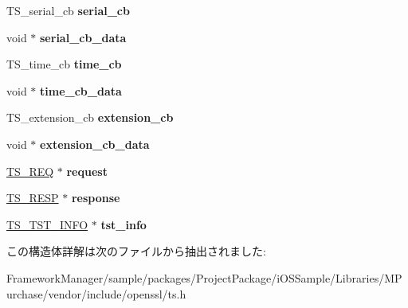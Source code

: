 \begin{DoxyCompactItemize}
\item 
\hypertarget{struct_t_s__resp__ctx_a26180bbb9b639e92b2b0fa2c84ce30f2}{}T\+S\+\_\+serial\+\_\+cb {\bfseries serial\+\_\+cb}\label{struct_t_s__resp__ctx_a26180bbb9b639e92b2b0fa2c84ce30f2}

\item 
\hypertarget{struct_t_s__resp__ctx_a428e1ae893e00dea7088a4caed4ff52b}{}void $\ast$ {\bfseries serial\+\_\+cb\+\_\+data}\label{struct_t_s__resp__ctx_a428e1ae893e00dea7088a4caed4ff52b}

\item 
\hypertarget{struct_t_s__resp__ctx_a838a0b82016f7bcf6aabe4102f1a4ac8}{}T\+S\+\_\+time\+\_\+cb {\bfseries time\+\_\+cb}\label{struct_t_s__resp__ctx_a838a0b82016f7bcf6aabe4102f1a4ac8}

\item 
\hypertarget{struct_t_s__resp__ctx_aa818a3e3400ed231cf9b6fb084fe5cd6}{}void $\ast$ {\bfseries time\+\_\+cb\+\_\+data}\label{struct_t_s__resp__ctx_aa818a3e3400ed231cf9b6fb084fe5cd6}

\item 
\hypertarget{struct_t_s__resp__ctx_a76759785bdc0835a4501abdd72954561}{}T\+S\+\_\+extension\+\_\+cb {\bfseries extension\+\_\+cb}\label{struct_t_s__resp__ctx_a76759785bdc0835a4501abdd72954561}

\item 
\hypertarget{struct_t_s__resp__ctx_aa732cb381d3c1f66e3097adff0df24f0}{}void $\ast$ {\bfseries extension\+\_\+cb\+\_\+data}\label{struct_t_s__resp__ctx_aa732cb381d3c1f66e3097adff0df24f0}

\item 
\hypertarget{struct_t_s__resp__ctx_a9c66652878d500b08d3c36e258a4d974}{}\hyperlink{struct_t_s__req__st}{T\+S\+\_\+\+R\+E\+Q} $\ast$ {\bfseries request}\label{struct_t_s__resp__ctx_a9c66652878d500b08d3c36e258a4d974}

\item 
\hypertarget{struct_t_s__resp__ctx_aff6fbaf908c062da548fb3e319d5ac68}{}\hyperlink{struct_t_s__resp__st}{T\+S\+\_\+\+R\+E\+S\+P} $\ast$ {\bfseries response}\label{struct_t_s__resp__ctx_aff6fbaf908c062da548fb3e319d5ac68}

\item 
\hypertarget{struct_t_s__resp__ctx_a314c23ef39b07c6119b982b9677c844e}{}\hyperlink{struct_t_s__tst__info__st}{T\+S\+\_\+\+T\+S\+T\+\_\+\+I\+N\+F\+O} $\ast$ {\bfseries tst\+\_\+info}\label{struct_t_s__resp__ctx_a314c23ef39b07c6119b982b9677c844e}

\end{DoxyCompactItemize}


この構造体詳解は次のファイルから抽出されました\+:\begin{DoxyCompactItemize}
\item 
Framework\+Manager/sample/packages/\+Project\+Package/i\+O\+S\+Sample/\+Libraries/\+M\+Purchase/vendor/include/openssl/ts.\+h\end{DoxyCompactItemize}
